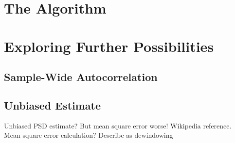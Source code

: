 \documentclass[a4paper, openany, oneside]{memoir}
\begin{document}
\section{The Algorithm}

\section{Exploring Further Possibilities}
\subsection{Sample-Wide Autocorrelation}

\subsection{Unbiased Estimate}
Unbiased PSD estimate? But mean square error worse! Wikipedia reference. Mean square error calculation? Describe as dewindowing
\end{document}
